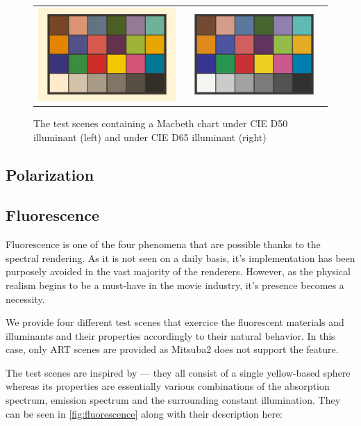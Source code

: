 \begin{figure}[httpb]
	\begin{tabular}{cc}
		\includegraphics[width=.45\linewidth]{img/macbeth_chart_D50.png}
		&
		\includegraphics[width=.45\linewidth]{img/macbeth_chart_D65.png}
	\end{tabular}
	\caption{The test scenes containing a Macbeth chart under CIE D50 illuminant (left) and under CIE D65 illuminant (right)}
	\label{fig:macbeth}
\end{figure}

\subsection{Polarization}

\subsection{Fluorescence}

Fluorescence is one of the four phenomena that are possible thanks to the spectral rendering. As it is not seen on a daily basis, it's implementation has been purposely avoided in the vast majority of the renderers. However, as the physical realism begins to be a must-have in the movie industry, it's presence becomes a necessity.

We provide four different test scenes that exercice the fluorescent materials and illuminants and their properties accordingly to their natural behavior. In this case, only ART scenes are provided as Mitsuba2 does not support the feature. 

The test scenes are inspired by \citet{mojzik2018handling} --- they all consist of a single yellow-based sphere whereas its properties are essentially various combinations of the absorption spectrum, emission spectrum and the surrounding constant illumination. They can be seen in \autoref{fig:fluorescence} along with their description here:

